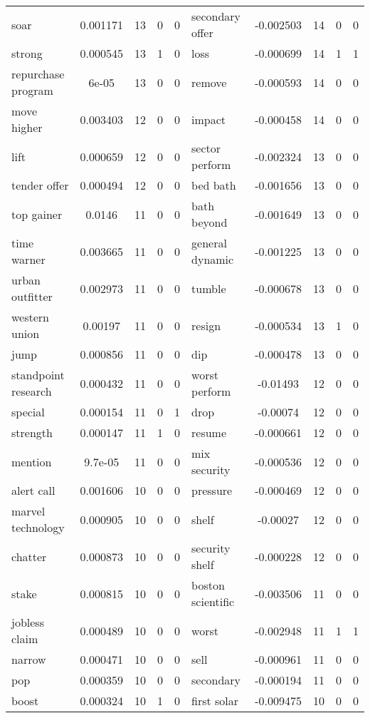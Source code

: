 \documentclass[ oneside,%
                    author={Joshua Felmeden},
                    degree={MEng},
                     title={Sentiment Analysis of Financial Headlines Based on Realised Stock Returns},
                  subtitle={Research}]{dissertation}
\begin{document}
\begin{table}[!ht]
\begin{tabular}{lcccclcccc}
soar & 0.001171 & 13 & 0 & 0 & secondary offer & -0.002503 & 14 & 0 & 0 \\
strong & 0.000545 & 13 & 1 & 0 & loss & -0.000699 & 14 & 1 & 1 \\
repurchase program & 6e-05 & 13 & 0 & 0 & remove & -0.000593 & 14 & 0 & 0 \\
move higher & 0.003403 & 12 & 0 & 0 & impact & -0.000458 & 14 & 0 & 0 \\
lift & 0.000659 & 12 & 0 & 0 & sector perform & -0.002324 & 13 & 0 & 0 \\
tender offer & 0.000494 & 12 & 0 & 0 & bed bath & -0.001656 & 13 & 0 & 0 \\
top gainer & 0.0146 & 11 & 0 & 0 & bath beyond & -0.001649 & 13 & 0 & 0 \\
time warner & 0.003665 & 11 & 0 & 0 & general dynamic & -0.001225 & 13 & 0 & 0 \\
urban outfitter & 0.002973 & 11 & 0 & 0 & tumble & -0.000678 & 13 & 0 & 0 \\
western union & 0.00197 & 11 & 0 & 0 & resign & -0.000534 & 13 & 1 & 0 \\
jump & 0.000856 & 11 & 0 & 0 & dip & -0.000478 & 13 & 0 & 0 \\
standpoint research & 0.000432 & 11 & 0 & 0 & worst perform & -0.01493 & 12 & 0 & 0 \\
special & 0.000154 & 11 & 0 & 1 & drop & -0.00074 & 12 & 0 & 0 \\
strength & 0.000147 & 11 & 1 & 0 & resume & -0.000661 & 12 & 0 & 0 \\
mention & 9.7e-05 & 11 & 0 & 0 & mix security & -0.000536 & 12 & 0 & 0 \\
alert call & 0.001606 & 10 & 0 & 0 & pressure & -0.000469 & 12 & 0 & 0 \\
marvel technology & 0.000905 & 10 & 0 & 0 & shelf & -0.00027 & 12 & 0 & 0 \\
chatter & 0.000873 & 10 & 0 & 0 & security shelf & -0.000228 & 12 & 0 & 0 \\
stake & 0.000815 & 10 & 0 & 0 & boston scientific & -0.003506 & 11 & 0 & 0 \\
jobless claim & 0.000489 & 10 & 0 & 0 & worst & -0.002948 & 11 & 1 & 1 \\
narrow & 0.000471 & 10 & 0 & 0 & sell & -0.000961 & 11 & 0 & 0 \\
pop & 0.000359 & 10 & 0 & 0 & secondary & -0.000194 & 11 & 0 & 0 \\
boost & 0.000324 & 10 & 1 & 0 & first solar & -0.009475 & 10 & 0 & 0 \\

\end{tabular}
\end{table}
\end{document}
